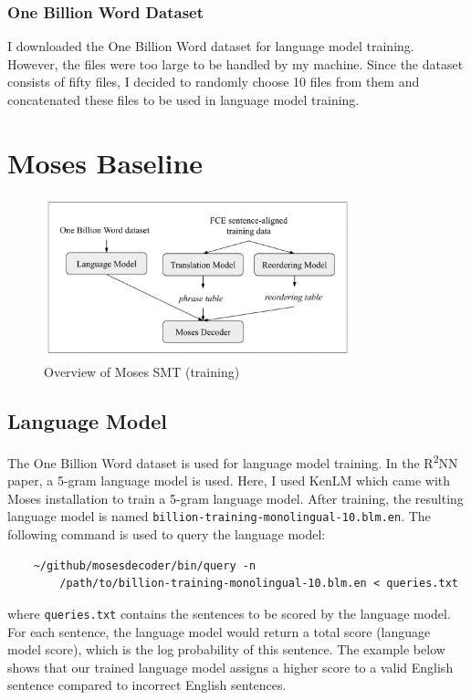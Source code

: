 \documentclass[12pt,a4paper,twoside,openright]{report}
\begin{document}
\subsubsection{One Billion Word Dataset}

I downloaded the One Billion Word dataset for language model training. However, the files were too large to be handled by my machine. Since the dataset consists of fifty files, I decided to randomly choose 10 files from them and concatenated these files to be used in language model training. 


\section{Moses Baseline} \label{section:moses_baseline}

\begin{figure}[ht]
\centering
\includegraphics[width=0.8\textwidth]{images/moses_pipeline.png}
\caption{Overview of Moses SMT (training)}
\label{fig:moses_pipeline}
\end{figure}

\subsection{Language Model}
The One Billion Word dataset is used for language model training. In the R\textsuperscript{2}NN paper, a 5-gram language model is used. Here, I used KenLM which came with Moses installation to train a 5-gram language model. After training, the resulting language model is named \texttt{billion-training-monolingual-10.blm.en}. The following command is used to query the language model:
\begin{verbatim}
    ~/github/mosesdecoder/bin/query -n 
        /path/to/billion-training-monolingual-10.blm.en < queries.txt
\end{verbatim}

where \texttt{queries.txt} contains the sentences to be scored by the language model. For each sentence, the language model would return a total score (language model score), which is the log probability of this sentence. The example below shows that our trained language model assigns a higher score to a valid English sentence compared to incorrect English sentences.
\end{document}
